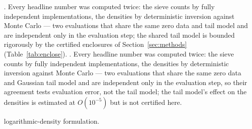 %
. Every headline number was
computed twice: the sieve counts by fully independent implementations,
the densities by deterministic inversion against Monte Carlo --- two
evaluations that share the same zero data and tail model and are
independent only in the evaluation step; the shared tail model is
bounded rigorously by the certified enclosures of
Section~\ref{sec:methods} (Table~\ref{tab:enclose}).
%
. Every headline number was
computed twice: the sieve counts by fully independent implementations,
the densities by deterministic inversion against Monte Carlo --- two
evaluations that share the same zero data and Gaussian tail model and
are independent only in the evaluation step, so their agreement tests
evaluation error, not the tail model; the tail model's effect on the
densities is estimated at $O(10^{-5})$ but is not certified here.


logarithmic-density formulation.

